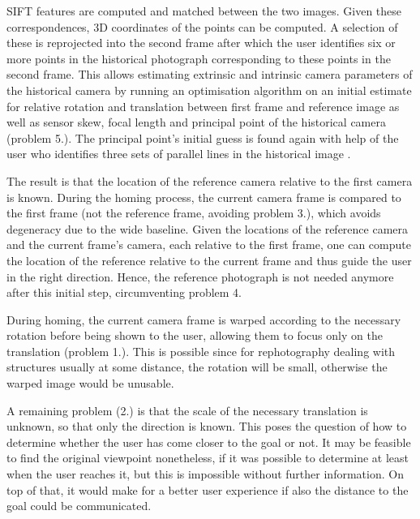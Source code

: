 SIFT features \citep{lowe2004} are computed and matched between the two images.
Given these correspondences, 3D coordinates of the points can be computed. A
selection of these is reprojected into the second frame after which the user
identifies six or more points in the historical photograph corresponding to
these points in the second frame. This allows estimating extrinsic and
intrinsic camera parameters of the historical camera by running an optimisation
algorithm on an initial estimate for relative rotation and translation between
first frame and reference image as well as sensor skew, focal length and
principal point of the historical camera (problem 5.).  The principal point's initial guess
is found again with help of the user who identifies three sets of parallel lines
in the historical image \citep[see][chapter 8.8]{h&z2004}.

The result is that the location of the reference camera relative to the first
camera is known. During the homing process, the current camera frame is compared
to the first frame (not the reference frame, avoiding problem 3.), which avoids
degeneracy due to the wide baseline. Given the locations of the reference camera
and the current frame's camera, each relative to the first frame, one can
compute the location of the reference relative to the current frame and thus
guide the user in the right direction. Hence, the reference photograph is not
needed anymore after this initial step, circumventing problem 4.

During homing, the current camera frame is warped according to the necessary
rotation before being shown to the user, allowing them to focus only on the
translation (problem 1.). This is possible since for rephotography
dealing with structures usually at some distance, the rotation will be small,
otherwise the warped image would be unusable.

A remaining problem (2.) is that the scale of the necessary translation is unknown,
so that only the direction is known. This poses the question of how to determine
whether the user has come closer to the goal or not. It may be feasible to find
the original viewpoint nonetheless, if it was possible to determine at least
when the user reaches it, but this is impossible without further information. On
top of that, it would make for a better user experience if also the distance to
the goal could be communicated.

